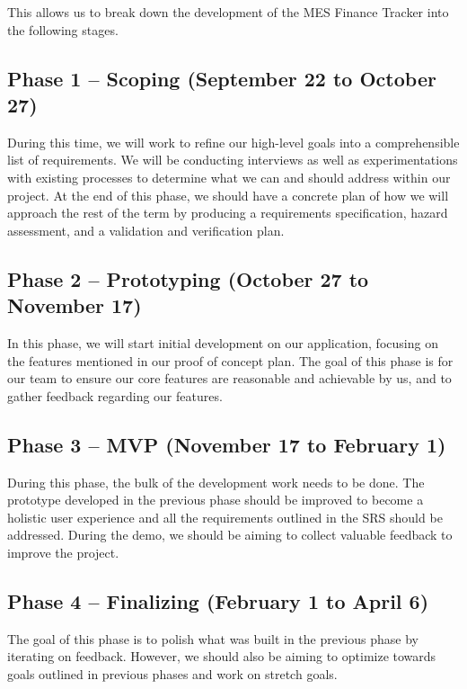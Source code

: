 \documentclass{article}
\begin{document}
This allows us to break down the development of the MES Finance Tracker into the following stages.

\subsection*{Phase 1 -- Scoping (September 22 to October 27)}
During this time, we will work to refine our high-level goals into a comprehensible list of requirements. 
We will be conducting interviews as well as experimentations with existing processes to determine what we can 
and should address within our project. At the end of this phase, we should have a concrete plan of how we 
will approach the rest of the term by producing a requirements specification, hazard assessment, and a 
validation and verification plan.

\subsection*{Phase 2 -- Prototyping (October 27 to November 17)}
In this phase, we will start initial development on our application, focusing on the features mentioned 
in our proof of concept plan. The goal of this phase is for our team to ensure our core features are 
reasonable and achievable by us, and to gather feedback regarding our features.

\subsection*{Phase 3 -- MVP (November 17 to February 1)}
During this phase, the bulk of the development work needs to be done. The prototype developed in the 
previous phase should be improved to become a holistic user experience and all the requirements outlined 
in the SRS should be addressed. During the demo, we should be aiming to collect valuable feedback to 
improve the project. 

\subsection*{Phase 4 -- Finalizing (February 1 to April 6)}
The goal of this phase is to polish what was built in the previous phase by iterating on feedback. 
However, we should also be aiming to optimize towards goals outlined in previous phases and work on 
stretch goals.
\end{document}
